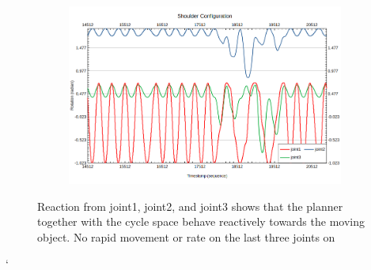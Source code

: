 \begin{figure}
\begin{subfigure}[b]{0.4\linewidth}
    \caption{}
  \end{subfigure}
  \begin{subfigure}[b]{0.4\linewidth}
    \includegraphics[width=\linewidth]{joint123u.png}
    \caption{}
  \end{subfigure}

  \caption{Reaction from joint1, joint2, and joint3 shows that the planner
   together with the cycle space behave reactively towards the moving object. No rapid movement or rate on the last three joints on \rimini}
  \label{fig:reaction_joint}
\end{figure}`
